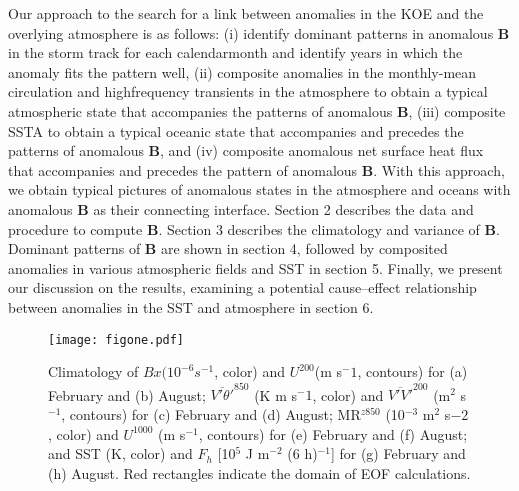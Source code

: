 \documentclass[twocol]{ametsocV5}
\begin{document}
Our approach to the search for a link between anomalies
in the KOE and the overlying atmosphere is as follows:
(i) identify dominant patterns in anomalous $\mathbf{B}$ in the
storm track for each calendarmonth and identify years in
which the anomaly fits the pattern well, (ii) composite
anomalies in the monthly-mean circulation and highfrequency
transients in the atmosphere to obtain a typical
atmospheric state that accompanies the patterns of
anomalous $\mathbf B$, (iii) composite SSTA to obtain a typical
oceanic state that accompanies and precedes the patterns
of anomalous $\mathbf B$, and (iv) composite anomalous net surface
heat flux that accompanies and precedes the pattern of
anomalous $\mathbf B$. With this approach, we obtain typical pictures
of anomalous states in the atmosphere and oceans
with anomalous $\mathbf{B}$ as their connecting interface.
Section 2 describes the data and procedure to compute
$\mathbf B$. Section 3 describes the climatology and variance of $\mathbf B$.
Dominant patterns of $\mathbf B$ are shown in section 4, followed by
composited anomalies in various atmospheric fields and
SST in section 5. Finally, we present our discussion on the
results, examining a potential cause--effect relationship
between anomalies in the SST and atmosphere in section 6.

\begin{figure*}[t]
\centerline{\texttt{[image: figone.pdf]}}

\caption{Climatology of $Bx (10^{-6} s^{-1}$, color) and $U^{200}$(m s$^-1$,
contours) for (a) February and (b) August; $\overline{V'\theta'}^{850}$
(K m s$^-1$, color) and 
$\overline{V'V'}^{200}$
(m$^2$ s$^{-1}$, contours) for (c) February and (d) August; MR$^{z850}$ 
(10$^{-3}$ m$^2$ s$-2$, color) and $U^{1000}$ (m s$^{-1}$, contours) 
for (e) February and (f) August;
and SST (K, color) and $F_h$ [10$^5$ J m$^{-2}$ (6 h)$^{-1}$] for (g)
February and (h) August. Red rectangles indicate the domain of EOF
calculations.} \label{fig1}
\end{figure*}
\end{document}
